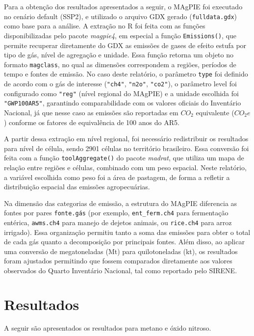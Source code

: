 \documentclass[
]{article}
\begin{document}
Para a obtenção dos resultados apresentados a seguir, o MAgPIE foi
executado no cenário default (SSP2), e utilizado o arquivo GDX gerado
(\texttt{fulldata.gdx}) como base para a análise. A extração no R foi
feita com as funções disponibilizadas pelo pacote \emph{magpie4}, em
especial a função \texttt{Emissions()}, que permite recuperar
diretamente do GDX as emissões de gases de efeito estufa por tipo de
gás, nível de agregação e unidade. Essa função retorna um objeto no
formato \texttt{magclass}, no qual as dimensões correspondem a regiões,
períodos de tempo e fontes de emissão. No caso deste relatório, o
parâmetro \texttt{type} foi definido de acordo com o gás de interesse
(\texttt{"ch4"}, \texttt{"n2o"}, \texttt{"co2"}), o parâmetro level foi
configurado como \texttt{"reg"} (nível regional do MAgPIE) e a unidade
escolhida foi \texttt{"GWP100AR5"}, garantindo comparabilidade com os
valores oficiais do Inventário Nacional, já que nesse caso as emissões
são reportadas em \(CO_2\) equivalente (\(CO_2e\)) conforme os fatores
de equivalência de 100 anos do AR5.

A partir dessa extração em nível regional, foi necessário redistribuir
os resultados para nível de célula, sendo 2901 células no território
brasileiro. Essa conversão foi feita com a função
\texttt{toolAggregate()} do pacote \emph{madrat}, que utiliza um mapa de
relação entre regiões e células, combinado com um peso espacial. Neste
relatório, a variável escolhida como peso foi a área de pastagem, de
forma a refletir a distribuição espacial das emissões agropecuárias.

Na dimensão das categorias de emissão, a estrutura do MAgPIE diferencia
as fontes por pares \texttt{fonte.gás} (por exemplo,
\texttt{ent\_ferm.ch4} para fermentação entérica, \texttt{awms.ch4} para
manejo de dejetos animais, ou \texttt{rice.ch4} para arroz irrigado).
Essa organização permitiu tanto a soma das emissões para obter o total
de cada gás quanto a decomposição por principais fontes. Além disso, ao
aplicar uma conversão de megatoneladas (Mt) para quilotoneladas (kt), os
resultados foram ajustados permitindo que fossem comparados diretamente
aos valores observados do Quarto Inventário Nacional, tal como reportado
pelo SIRENE.

\section{Resultados}\label{resultados}

A seguir são apresentados os resultados para metano e óxido nitroso.
\end{document}

